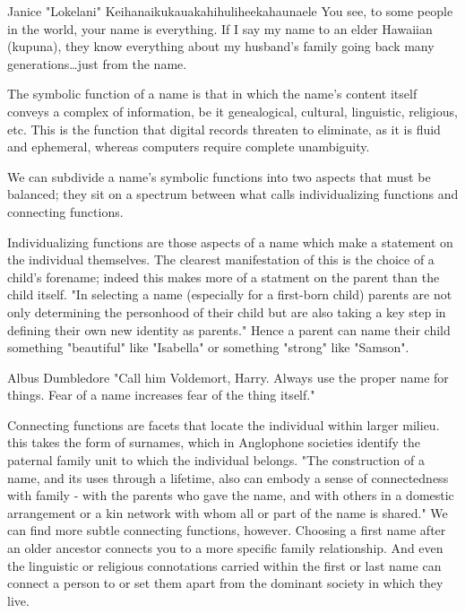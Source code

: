 \begin{aquote}{Janice "Lokelani" Keihanaikukauakahihuliheekahaunaele
	\parencite{lee-valley}}
	You see, to some people in the world, your name is everything. If I say my
	name to an elder Hawaiian (kupuna), they know everything about my husband's
	family going back many generations…just from the name.
\end{aquote}

The symbolic function of a name is that in which the name's content itself
conveys a complex of information, be it genealogical, cultural, linguistic,
religious, etc. This is the function that digital records threaten to eliminate,
as it is fluid and ephemeral, whereas computers require complete unambiguity.

We can subdivide a name's symbolic functions into two aspects that must be
balanced; they sit on a spectrum between what \textcite{finch08} calls
individualizing functions and connecting functions.

Individualizing functions are those aspects of a name which make a statement on
the individual themselves. The clearest manifestation of this is the choice of a
child's forename; indeed this makes more of a statment on the parent than the
child itself. "In selecting a name (especially for a first-born child) parents
are not only determining the personhood of their child but are also taking a key
step in defining their own new identity as parents." \parencite[718]{finch08}
Hence a parent can name their child something "beautiful" like "Isabella" or
something "strong" like "Samson".

\begin{aquote}{Albus Dumbledore}
"Call him Voldemort, Harry. Always use the proper name for things. Fear of a
name increases fear of the thing itself." \parencite{rowling97}
\end{aquote}

Connecting functions are facets that locate the individual within larger milieu.
this takes the form of surnames, which in Anglophone societies identify the
paternal family unit to which the individual belongs. "The construction of a
name, and its uses through a lifetime, also can embody a sense of connectedness
with family - with the parents who gave the name, and with others in a domestic
arrangement or a kin network with whom all or part of the name is shared."
\parencite[711]{finch08} We can find more subtle connecting functions, however.
Choosing a first name after an older ancestor connects you to a more specific
family relationship. And even the linguistic or religious connotations carried
within the first or last name can connect a person to or set them apart from the
dominant society in which they live.

